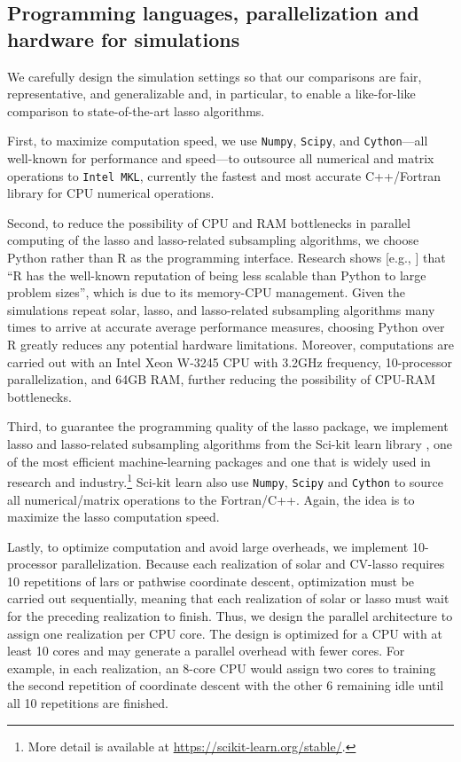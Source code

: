 \documentclass[11pt,review,authoryear]{elsarticle}
\begin{document}
\subsection{Programming languages, parallelization and hardware for simulations}

We carefully design the simulation settings so that our comparisons are fair, representative, and generalizable and, in particular, to enable a like-for-like comparison to state-of-the-art lasso algorithms.

First, to maximize computation speed, we use \texttt{Numpy}, \texttt{Scipy}, and \texttt{Cython}---all well-known for performance and speed---to outsource all numerical and matrix operations to \texttt{Intel MKL}, currently the fastest and most accurate C++/Fortran library for CPU numerical operations.

Second, to reduce the possibility of CPU and RAM bottlenecks in parallel computing of the lasso and lasso-related subsampling algorithms, we choose Python rather than R as the programming interface. Research shows [e.g., \citet{donoho201750}]  that ``R has the well-known reputation of being less scalable than Python to large problem sizes'', which is  due to its memory-CPU management. Given the simulations repeat solar, lasso, and lasso-related subsampling algorithms many times to arrive at accurate average performance measures, choosing Python over R greatly reduces any potential hardware limitations. Moreover, computations are carried out with an Intel Xeon W-3245 CPU with 3.2GHz frequency, 10-processor parallelization, and 64GB RAM, further reducing the possibility of CPU-RAM bottlenecks.

Third, to guarantee the programming quality of the lasso package, we implement lasso and lasso-related subsampling algorithms from the {\sf Sci-kit learn} library \citep{scikit-learn}, one of the most efficient machine-learning packages and one that is widely used in research and industry.\footnote{More detail is available at \url{https://scikit-learn.org/stable/}.} {\sf Sci-kit learn} also use \texttt{Numpy}, \texttt{Scipy} and \texttt{Cython} to source all numerical/matrix operations to the Fortran/C++. Again, the idea is to maximize the lasso computation speed.

Lastly, to optimize computation and avoid large overheads, we implement 10-processor parallelization. Because each realization of solar and CV-lasso requires 10 repetitions of lars or pathwise coordinate descent, optimization must be carried out sequentially, meaning that each realization of solar or lasso must wait for the preceding realization to finish. Thus, we design the parallel architecture to assign one realization per CPU core. The design is optimized for a CPU with at least 10 cores and may generate a parallel overhead with fewer cores. For example, in each realization, an 8-core CPU would assign two cores to training the second repetition of coordinate descent with the other 6 remaining idle until all 10 repetitions are finished.
\end{document}
